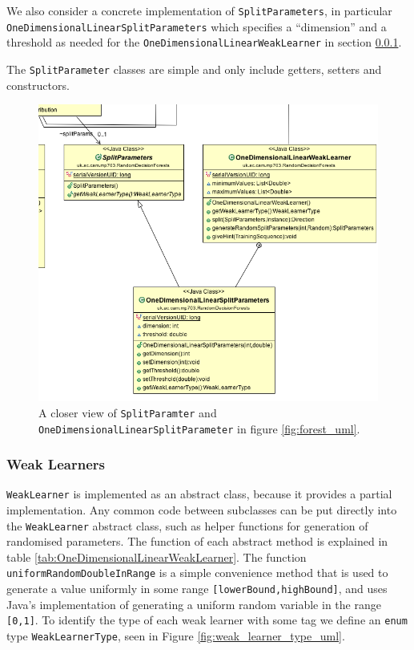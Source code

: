 \documentclass[12pt,twoside,notitlepage]{report}
\begin{document}
                We also consider a concrete implementation of \texttt{SplitParameters}, in particular
                \texttt{OneDimensionalLinearSplitParameters} which specifies a ``dimension'' and a threshold as needed 
                for the \texttt{OneDimensionalLinearWeakLearner} in section \ref{sec:weak_learner}. 

                The \texttt{SplitParameter} classes are simple and only include getters, setters and constructors. 

                \begin{figure}[H]
                    \centering
                    \includegraphics[scale=0.5]{SplitParam_Forest_UML}
                    \caption[A closer view of \texttt{SplitParamter}]{A closer view of \texttt{SplitParamter} and \texttt{OneDimensionalLinearSplitParameter} in figure \ref{fig:forest_uml}.}
                    \label{fig:split_param_uml}
                \end{figure}




            \subsubsection{Weak Learners} \label{sec:weak_learner}
                \texttt{WeakLearner} is implemented as an abstract class, because it provides a partial 
                implementation. Any common code between subclasses can be put directly into the \texttt{WeakLearner} 
                abstract class, such as helper functions for generation of randomised parameters. The function of each 
                abstract method is explained in table \ref{tab:OneDimensionalLinearWeakLearner}. The function 
                \texttt{uniformRandomDoubleInRange} is a simple convenience method that is used to generate a value 
                uniformly in some range \texttt{[lowerBound,highBound]}, 
                and uses Java's implementation of generating a uniform random variable in the range \texttt{[0,1]}. To 
                identify the type of each weak learner with some tag we define an \texttt{enum} type 
                \texttt{WeakLearnerType}, seen in Figure \ref{fig:weak_learner_type_uml}. 
\end{document}
